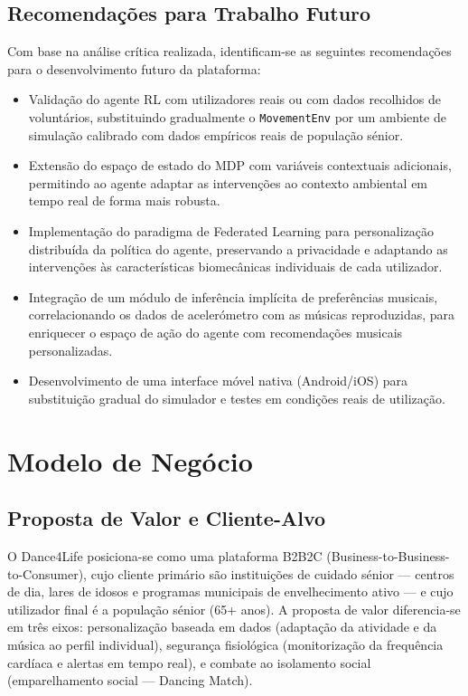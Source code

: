 \documentclass[runningheads]{llncs}
\begin{document}
\subsection{Recomendações para Trabalho Futuro}
Com base na análise crítica realizada, identificam-se as seguintes recomendações para o desenvolvimento futuro da plataforma:
\begin{itemize}
\item Validação do agente RL com utilizadores reais ou com dados recolhidos de voluntários, substituindo gradualmente o \texttt{MovementEnv} por um ambiente de simulação calibrado com dados empíricos reais de população sénior.
\item Extensão do espaço de estado do MDP com variáveis contextuais adicionais, permitindo ao agente adaptar as intervenções ao contexto ambiental em tempo real de forma mais robusta.
\item Implementação do paradigma de Federated Learning para personalização distribuída da política do agente, preservando a privacidade e adaptando as intervenções às características biomecânicas individuais de cada utilizador.
\item Integração de um módulo de inferência implícita de preferências musicais, correlacionando os dados de acelerómetro com as músicas reproduzidas, para enriquecer o espaço de ação do agente com recomendações musicais personalizadas.
\item Desenvolvimento de uma interface móvel nativa (Android/iOS) para substituição gradual do simulador e testes em condições reais de utilização.
\end{itemize}

\section{Modelo de Negócio}
\subsection{Proposta de Valor e Cliente-Alvo}
O Dance4Life posiciona-se como uma plataforma B2B2C (Business-to-Business-to-Consumer), cujo cliente primário são instituições de cuidado sénior — centros de dia, lares de idosos e programas municipais de envelhecimento ativo — e cujo utilizador final é a população sénior (65+ anos). A proposta de valor diferencia-se em três eixos: personalização baseada em dados (adaptação da atividade e da música ao perfil individual), segurança fisiológica (monitorização da frequência cardíaca e alertas em tempo real), e combate ao isolamento social (emparelhamento social — Dancing Match).
\end{document}
